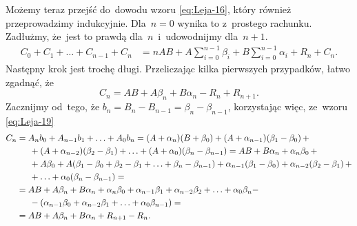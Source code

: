 \documentclass[a4paper,11pt]{article}
\begin{document}
Możemy teraz przejść do~dowodu wzoru \eqref{eq:Leja-16}, który również
przeprowadzimy indukcyjnie. Dla~$n = 0$ wynika to z~prostego rachunku.
Zadłużmy, że~jest to prawdą dla~$n$~i~udowodnijmy dla~$n + 1$.
\begin{equation}
  \label{eq:Leja-24}
  \begin{split}
    C_{ 0 } + C_{ 1 } + \ldots + C_{ n - 1 } + C_{ n }
    &= n AB + A \sum_{ i = 0 }^{ n - 1 } \beta_{ i } + B \sum_{ i = 0 }^{ n - 1 }
      \alpha_{ i } + R_{ n } + C_{ n }.
  \end{split}
\end{equation}
Następny krok jest trochę długi. Przeliczając kilka pierwszych
przypadków, łatwo zgadnąć, że
\begin{equation}
  \label{eq:Leja-25}
    C_{ n } = AB + A \beta_{ n } + B \alpha_{ n } - R_{ n } + R_{ n + 1 }.
\end{equation}
Zacznijmy od~tego, że
$b_{ n } = B_{ n } - B_{ n - 1 } = \beta_{ n } - \beta_{ n - 1 }$,
korzystając więc, ze~wzoru \eqref{eq:Leja-19}
\begin{equation}
  \label{eq:Leja-26}
  \begin{split}
    C_{ n }
    &= A_{ n } b_{ 0 } + A_{ n - 1 } b_{ 1 } + \ldots + A_{ 0 }
      b_{ n } = ( A + \alpha_{ n } ) ( B + \beta_{ 0 } ) + ( A + \alpha_{ n - 1 } )
      ( \beta_{ 1 } - \beta_{ 0 } ) \, + \\
    &\hspace{1.5em} + ( A + \alpha_{ n - 2 } )( \beta_{ 2 } - \beta_{ 1 } ) + \ldots
      + ( A + \alpha_{ 0 } ) ( \beta_{ n } - \beta_{ n - 1 } )
      = AB + B \alpha_{ n } + \alpha_{ n } \beta_{ 0 } \, + \\
    &\hspace{1.5em} + A \beta_{ 0 } + A ( \beta_{ 1 } - \beta_{ 0 } + \beta_{ 2 }
      - \beta_{ 1 } + \ldots + \beta_{ n } - \beta_{ n - 1 } ) + \alpha_{ n - 1 } ( \beta_{ 1 } - \beta_{ 0 } )
      + \alpha_{ n - 2 } ( \beta_{ 2 } - \beta_{ 1 } ) \, + \\
    &\hspace{1.5em} + \ldots + \alpha_{ 0 } ( \beta_{ n } - \beta_{ n - 1 } ) = \\
    &=
      AB + A \beta_{ n } + B \alpha_{ n } + \alpha_{ n } \beta_{ 0 } + \alpha_{ n - 1 } \beta_{ 1 }
      + \alpha_{ n - 2 } \beta_{ 2 } + \ldots + \alpha_{ 0 } \beta_{ n } - \\
    &\hspace{1.5em} - ( \alpha_{ n - 1 } \beta_{ 0 } + \alpha_{ n - 2 } \beta_{ 1 }
      + \ldots + \alpha_{ 0 } \beta_{ n - 1 } ) = \\
    &= AB + A \beta_{ n } + B \alpha_{ n } + R_{ n + 1 } - R_{ n }.
  \end{split}
\end{equation}
\end{document}

